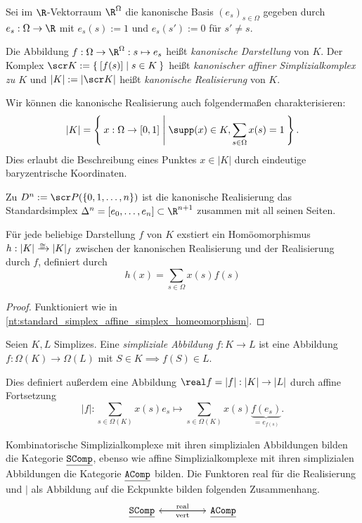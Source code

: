 \begin{df}
	Sei im $\R$-Vektorraum $\R^\Omega$ die kanonische Basis $(e_s)_{s \in \Omega}$ gegeben durch $e_s: \Omega \to \R$ mit $e_s(s) := 1$ und $e_s(s') := 0$ für $s' \neq s$.

	Die Abbildung $f: \Omega \to \R^\Omega: s \mapsto e_s$ heißt \emph{kanonische Darstellung} von $K$.
	Der Komplex $\scr K := \Set{ [f(s)] | s \in K}$ heißt \emph{kanonischer affiner Simplizialkomplex zu $K$} und $|K| := |\scr K|$ heißt \emph{kanonische Realisierung} von $K$.
	\begin{note}
		Wir können die kanonische Realisierung auch folgendermaßen charakterisieren:
		\[
			|K| = \Set{ x: \Omega \to [0,1] | \supp(x) \in K, \sum_{s \in \Omega} x(s) = 1 }.
		\]
		Dies erlaubt die Beschreibung eines Punktes $x \in |K|$ durch eindeutige baryzentrische Koordinaten.
	\end{note}
\end{df}


\begin{ex}
	Zu $D^n := \scr P(\{0, 1, \dotsc, n\})$ ist die kanonische Realisierung das Standardsimplex $\Delta^n = [e_0, \dotsc, e_n] \subset \R^{n+1}$ zusammen mit all seinen Seiten.
\end{ex}

\begin{nt}
	Für jede beliebige Darstellung $f$ von $K$ exstiert ein Homöomorphismus $h: |K| \homto |K|_f$ zwischen der kanonischen Realisierung und der Realisierung durch $f$, definiert durch
	\[
		h(x) = \sum_{s\in \Omega} x(s) f(s)
	\]
	\begin{proof}
		Funktioniert wie in \ref{nt:standard_simplex_affine_simplex_homeomorphism}.
	\end{proof}
\end{nt}

\begin{df}
	Seien $K, L$ Simplizes.
	Eine \emph{simpliziale Abbildung} $f: K \to L$ ist eine Abbildung $f: \Omega(K) \to \Omega(L)$ mit $S \in K \implies f(S) \in L$.

	Dies definiert außerdem eine Abbildung $\real f = |f|: |K| \to |L|$ durch affine Fortsetzung
	\[
		|f|:
		\sum_{s \in \Omega(K)} x(s) e_s
		\mapsto
		\sum_{s \in \Omega(K)} x(s) \underbrace{f(e_s)}_{= e_{f(s)}}.
	\]
\end{df}

\begin{nt}
	Kombinatorische Simplizialkomplexe mit ihren simplizialen Abbildungen bilden die Kategorie $\underline{\mathtt{SComp}}$, ebenso wie affine Simplizialkomplexe mit ihren simplizialen Abbildungen die Kategorie $\underline{\mathtt{AComp}}$ bilden.
	Die Funktoren $\mathrm{real}$ für die Realisierung und $\vert$ als Abbildung auf die Eckpunkte bilden folgenden Zusammenhang.
	\[
		\begin{tikzcd}
			\Cat{SComp} \arrow{rr}{\mathrm{real}} & & \Cat{AComp} \arrow{ll}{\vert}
		\end{tikzcd}
	\]
\end{nt}


